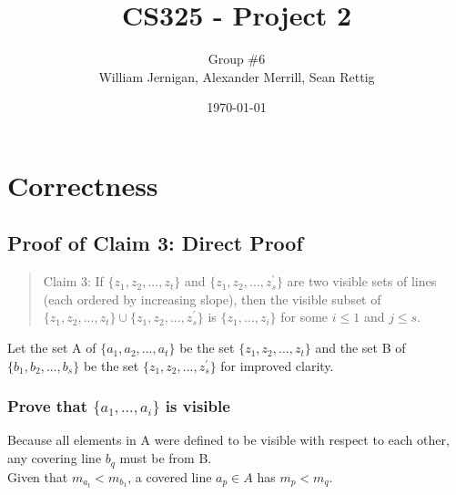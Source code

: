 \documentclass{article}
\title{CS325 - Project 2}
\author{Group \#6 \\ William Jernigan, Alexander Merrill, Sean Rettig}
\date{\today}
\begin{document}
\maketitle

\section*{Correctness}
\subsection*{Proof of Claim 3: Direct Proof}

\begin{quote}
Claim 3: If $\{z_{1},z_{2},...,z_{t}\}$ and $\{z_{1},z_{2},...,z_{s}^{'}\}$ are two visible sets of lines (each ordered by increasing slope), then the visible subset of $\{z_{1},z_{2},...,z_{t}\}\cup\{z_{1},z_{2},...,z_{s}^{'}\}$ is $\{z_{1},...,z_{i}\}$ for some $i \leq 1$ and $j \leq s$.
\end{quote}
Let the set A of $\{a_{1},a_{2},...,a_{t}\}$ be the set $\{z_{1},z_{2},...,z_{t}\}$ and the set B of  $\{b_{1},b_{2},...,b_{s}\}$ be the set $\{z_{1},z_{2},...,z_{s}^{'}\}$ for improved clarity.

\subsubsection*{Prove that $\{a_{1},...,a_{i}\}$ is visible}
    Because all elements in A were defined to be visible with respect to each other, any covering line $b_{q}$ must be from B.\\
    Given that $m_{a_{t}} < m_{b_{1}}$, a covered line $a_{p} \in A$ has $m_{p} < m_{q}$.
    
\end{document}
